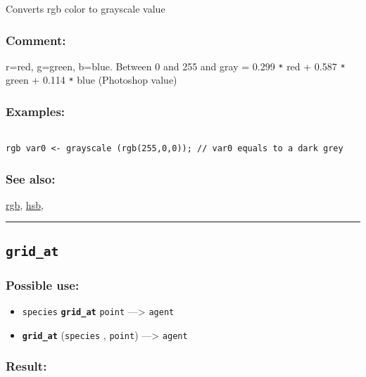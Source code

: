 \documentclass[]{book}
\providecommand{\tightlist}{%
  \setlength{\itemsep}{0pt}\setlength{\parskip}{0pt}}
\theoremstyle{definition}
\theoremstyle{definition}
\theoremstyle{definition}
\theoremstyle{remark}
\begin{document}
Converts rgb color to grayscale value

\subsubsection{Comment:}\label{comment-44}

r=red, g=green, b=blue. Between 0 and 255 and gray = 0.299 \texttt{*}
red + 0.587 \texttt{*} green + 0.114 \texttt{*} blue (Photoshop value)

\subsubsection{Examples:}\label{examples-181}

\begin{verbatim}
 
rgb var0 <- grayscale (rgb(255,0,0)); // var0 equals to a dark grey
\end{verbatim}

\subsubsection{See also:}\label{see-also-108}

\href{OperatorsNR\#rgb}{rgb}, \href{OperatorsDH\#hsb}{hsb},

\begin{center}\rule{0.5\linewidth}{\linethickness}\end{center}

\subsection{\texorpdfstring{\texttt{grid\_at}}{grid\_at}}\label{grid_at}

\subsubsection{Possible use:}\label{possible-use-241}

\begin{itemize}
\tightlist
\item
  \texttt{species} \textbf{\texttt{grid\_at}} \texttt{point}
  ---\textgreater{} \texttt{agent}
\item
  \textbf{\texttt{grid\_at}} (\texttt{species} , \texttt{point})
  ---\textgreater{} \texttt{agent}
\end{itemize}

\subsubsection{Result:}\label{result-232}
\end{document}
